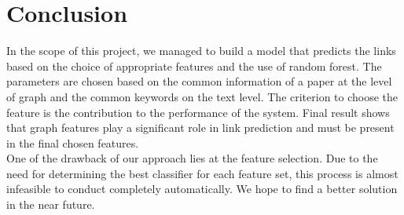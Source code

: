 \documentclass{article}
\begin{document}
\section{Conclusion}
\label{sec:conclusion}
In the scope of this project, we managed to build a model that predicts the links based on the choice of appropriate features and the use of random forest. The parameters are chosen based on the common information of a paper at the level of graph and the common keywords on the text level. The criterion to choose the feature is the contribution to the performance of the system. Final result shows that graph features play a significant role in link prediction and must be present in the final chosen features.\\
One of the drawback of our approach lies at the feature selection. Due to the need for determining the best classifier for each feature set, this process is almost infeasible to conduct completely automatically. We hope to find a better solution in the near future.



\end{document}
